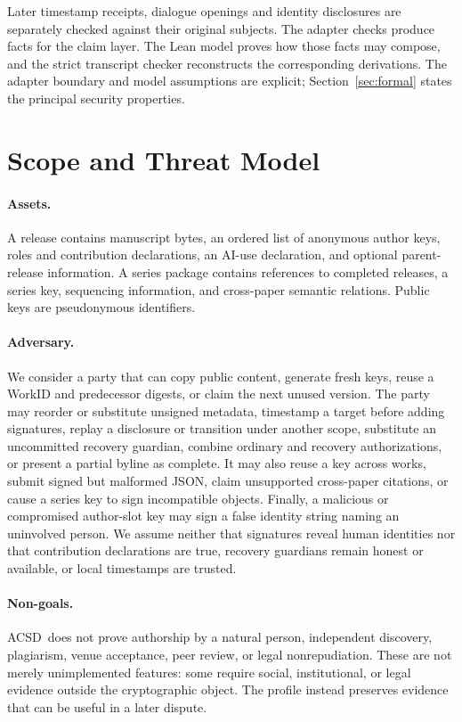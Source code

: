 \documentclass[conference,compsoc]{IEEEtran}
\newcommand{\acsd}{\textsc{ACSD}}
\begin{document}
Later timestamp receipts, dialogue openings and identity disclosures are
separately checked against their original subjects. The adapter checks produce
facts for the claim layer. The Lean model proves how those facts may compose,
and the strict transcript checker reconstructs the corresponding derivations.
The adapter boundary and model assumptions are explicit; Section~\ref{sec:formal}
states the principal security properties.



\section{Scope and Threat Model}

\paragraph{Assets.} A release contains manuscript bytes, an ordered list of anonymous author keys, roles and contribution declarations, an AI-use declaration, and optional parent-release information. A series package contains references to completed releases, a series key, sequencing information, and cross-paper semantic relations. Public keys are pseudonymous identifiers.

\paragraph{Adversary.} We consider a party that can copy public content,
generate fresh keys, reuse a WorkID and predecessor digests, or claim the next
unused version. The party may reorder or substitute unsigned metadata,
timestamp a target before adding signatures, replay a disclosure or transition
under another scope, substitute an uncommitted recovery guardian, combine
ordinary and recovery authorizations, or present a partial byline as complete.
It may also reuse a key across works, submit signed but malformed JSON, claim
unsupported cross-paper citations, or cause a series key to sign incompatible
objects. Finally, a malicious or compromised author-slot key may sign a false
identity string naming an uninvolved person. We assume neither that signatures
reveal human identities nor that contribution declarations are true, recovery
guardians remain honest or available, or local timestamps are trusted.

\paragraph{Non-goals.} \acsd\ does not prove authorship by a natural person, independent discovery, plagiarism, venue acceptance, peer review, or legal nonrepudiation. These are not merely unimplemented features: some require social, institutional, or legal evidence outside the cryptographic object. The profile instead preserves evidence that can be useful in a later dispute.
\end{document}

